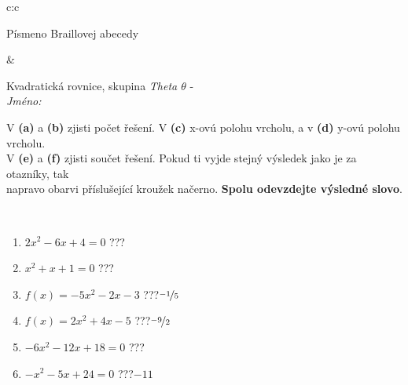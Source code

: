\documentclass[10pt]{report}
\begin{document}
\begin{tabular}{c:c}
\begin{minipage}[c][104.5mm][t]{0.5\linewidth}
\begin{center}
\begin{minipage}{0.20\linewidth}
\begin{center}
{\small Písmeno Braillovej abecedy}
\end{center}
\end{minipage}
\end{center}
\end{minipage}
&
\begin{minipage}[c][104.5mm][t]{0.5\linewidth}
\begin{center}
\vspace{7mm}
{\huge Kvadratická rovnice, skupina \textit{Theta $\theta$} -}\\[5mm]
\textit{Jméno:}\phantom{xxxxxxxxxxxxxxxxxxxxxxxxxxxxxxxxxxxxxxxxxxxxxxxxxxxxxxxxxxxxxxxxx}\\[5mm]
\begin{minipage}{0.95\linewidth}
\begin{center}
V \textbf{(a)} a \textbf{(b)} zjisti počet řešení. V \textbf{(c)} x-ovú polohu vrcholu, a v \textbf{(d)} y-ovú polohu vrcholu.\\V \textbf{(e)} a \textbf{(f)} zjisti součet řešení. Pokud ti vyjde stejný výsledek jako je za otazníky, tak\\napravo obarvi příslušející kroužek načerno. \textbf{Spolu odevzdejte výsledné slovo}.
\end{center}
\end{minipage}
\\[1mm]
\begin{minipage}{0.79\linewidth}
\begin{center}
\begin{varwidth}{\linewidth}
\begin{enumerate}
\Large
\item $2x^2-6x+4=0$\quad \dotfill\; ???\;\dotfill {}
\item $x^2+x+1=0$\quad \dotfill\; ???\;\dotfill {}
\item $f(x)=-5x^2-2x-3$\quad \dotfill\; ???\;\dotfill \quad $\nicefrac{-1}{5}$
\item $f(x)=2x^2+4x-5$\quad \dotfill\; ???\;\dotfill \quad $\nicefrac{-9}{2}$
\item $-6x^2-12x+18=0$\quad \dotfill\; ???\;\dotfill {}
\item $-x^2-5x+24=0$\quad \dotfill\; ???\;\dotfill \quad $-11$
\end{enumerate}
\end{varwidth}
\end{center}
\end{minipage}
\begin{minipage}{0.20\linewidth}
\begin{center}

\end{center}
\end{minipage}
\end{center}
\end{minipage}
\end{tabular}
\end{document}
